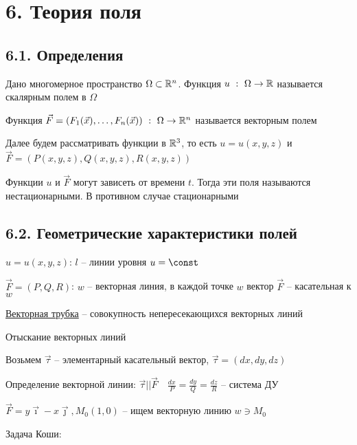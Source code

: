 \documentclass[12pt]{article}
\begin{document}
    \clearpage


    \section{6. Теория поля}

    \subsection{6.1. Определения}

    \hypertarget{scalarfield}{}

     Дано многомерное пространство $\Omega \subset \mathbb{R}^n$. Функция $u \ : \ \Omega \to \Real$ называется скалярным полем в $\Omega$

    \hypertarget{vectorfield}{}

     Функция $\vec{F} = (F_1(\vec{x}), \dots, F_n(\vec{x})) \ : \ \Omega \to \mathbb{R}^n$ называется векторным полем

    \Nota Далее будем рассматривать функции в $\mathbb{R}^3$, то есть $u = u(x, y, z)$ и $\vec{F} = (P(x, y, z), Q(x, y, z), R(x, y, z))$

    \Notas Функции $u$ и $\vec{F}$ могут зависеть от времени $t$. Тогда эти поля называются нестационарными. В противном случае стационарными

    \hypertarget{scalarandvectorfieldgeometric}{}

    \subsection{6.2. Геометрические характеристики полей}

    $u = u(x, y, z)$: $l$ -- линии уровня $u = \const$

    $\vec{F} = (P, Q, R)$: $w$ -- векторная линия, в каждой точке $w$ вектор $\vec{F}$ -- касательная к $w$

    \underline{Векторная трубка} -- совокупность непересекающихся векторных линий

    \Nota Отыскание векторных линий

    Возьмем $\vec{\tau}$ -- элементарный касательный вектор, $\vec{\tau} = (dx, dy, dz)$

    Определение векторной линии: $\vec{\tau} || \vec{F} \quad \frac{dx}{P} = \frac{dy}{Q} = \frac{dz}{R}$ -- система ДУ

    \Ex $\vec{F} = y \vec\imath - x \vec\jmath, M_0 (1, 0)$ -- ищем векторную линию $w \ni M_0$

    Задача Коши:
\end{document}

